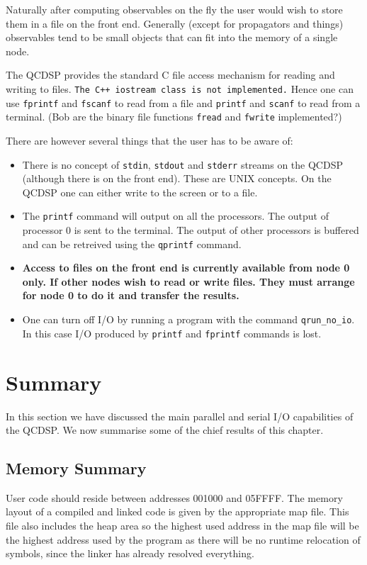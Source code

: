 Naturally after computing observables on the fly the user would wish to 
store them in a file on the front end. Generally (except for propagators
and things) observables tend to be small objects that can fit into the 
memory of a single node. 

The QCDSP provides the standard C file access mechanism for reading and 
writing to files. {\tt The C++ iostream class is not implemented.}
Hence one can use {\tt fprintf} and {\tt fscanf} to read from a file
and {\tt printf} and {\tt scanf} to read from a terminal. (Bob are the 
binary file functions {\tt fread} and {\tt fwrite} implemented?)

There are however several things that the user has to be aware of:
\begin{itemize}
\item
There is no concept of {\tt stdin}, {\tt stdout} and {\tt stderr} streams
on the QCDSP (although there is on the front end). These are UNIX concepts.
On the QCDSP one can either write to the screen or to a file.
\item
The {\tt printf} command will output on all the processors. The output
of processor 0 is sent to the terminal. The output of other processors
is buffered and can be retreived using the {\tt qprintf} command.
\item
{\bf Access to files on the front end is currently available from node 0 
only. If other nodes wish to read or write files. They must arrange for
node 0 to do it and transfer the results.}
\item
One can turn off I/O by running a program with the command {\tt qrun\_no\_io}.
In this case I/O produced by {\tt printf} and {\tt fprintf} commands is lost.
\end{itemize}

\section{Summary}
In this section we have discussed the main parallel and serial I/O 
capabilities of the QCDSP. We now summarise some of the chief results
of this chapter.

\subsection{Memory Summary} 
User code should reside between addresses 001000 and 05FFFF. The memory
layout of a compiled and linked code is given by the appropriate map file.
This file also includes the heap area so the highest used address in the 
map file will be the highest address used by the program as there will
be no runtime relocation of symbols, since the linker has already resolved
everything.

